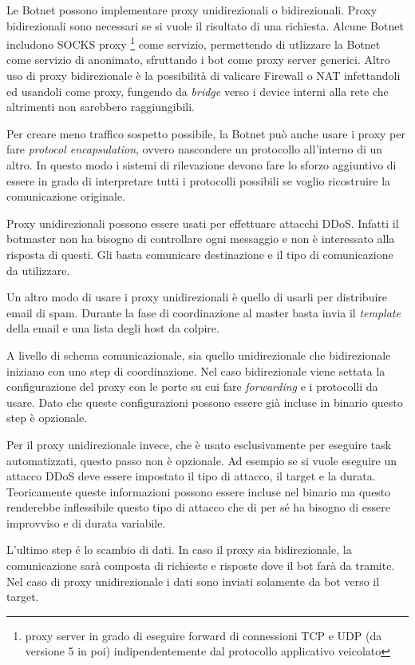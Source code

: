 Le Botnet possono implementare proxy unidirezionali o bidirezionali. 
Proxy bidirezionali sono necessari se si vuole il risultato di una richiesta. Alcune Botnet includono SOCKS proxy \footnote{proxy server in grado di eseguire forward di connessioni TCP e UDP (da versione 5 in poi) indipendentemente dal protocollo applicativo veicolato}  come servizio, permettendo di utlizzare la Botnet come servizio di anonimato, sfruttando  i bot come proxy server generici.
Altro  uso di proxy bidirezionale è la possibilità di valicare Firewall o NAT infettandoli ed usandoli come proxy, fungendo da \textit{bridge} verso i device interni alla rete che altrimenti non sarebbero raggiungibili.

Per creare meno traffico sospetto possibile, la Botnet può anche usare i proxy per fare \emph{protocol encapsulation}, ovvero nascondere un protocollo all'interno di un altro. In questo modo i sistemi di rilevazione devono fare lo sforzo aggiuntivo di essere in grado di interpretare tutti i protocolli possibili se voglio ricostruire la comunicazione originale.

Proxy unidirezionali possono essere usati per effettuare attacchi DDoS. Infatti il botmaster non ha bisogno di controllare ogni messaggio e non è interessato alla risposta di questi. Gli basta comunicare destinazione e il tipo di comunicazione da utilizzare.

Un altro modo di usare i proxy unidirezionali è quello di usarli per distribuire email di spam. Durante la fase di coordinazione al  master basta invia il \textit{template} della email e una lista degli host da colpire.

A livello di schema comunicazionale, sia quello unidirezionale che bidirezionale iniziano con uno step di coordinazione.
Nel caso bidirezionale viene settata la configurazione del proxy con le porte su cui fare \textit{forwarding} e i protocolli da usare. Dato che queste configurazioni possono essere già incluse in binario questo step è opzionale.

Per il proxy unidirezionale invece, che è usato esclusivamente per eseguire task automatizzati, questo passo non è opzionale. Ad esempio se si vuole eseguire un attacco DDoS deve essere impostato il tipo di attacco, il target e la durata. Teoricamente queste informazioni possono essere incluse nel binario ma questo renderebbe inflessibile questo tipo di attacco che di per sé ha bisogno di essere improvviso e di durata variabile.

L'ultimo step é lo scambio di dati. In caso il proxy sia bidirezionale, la comunicazione sarà composta di richieste e risposte dove il bot farà da tramite.  Nel caso di proxy unidirezionale i dati sono inviati solamente da bot verso il target. 
